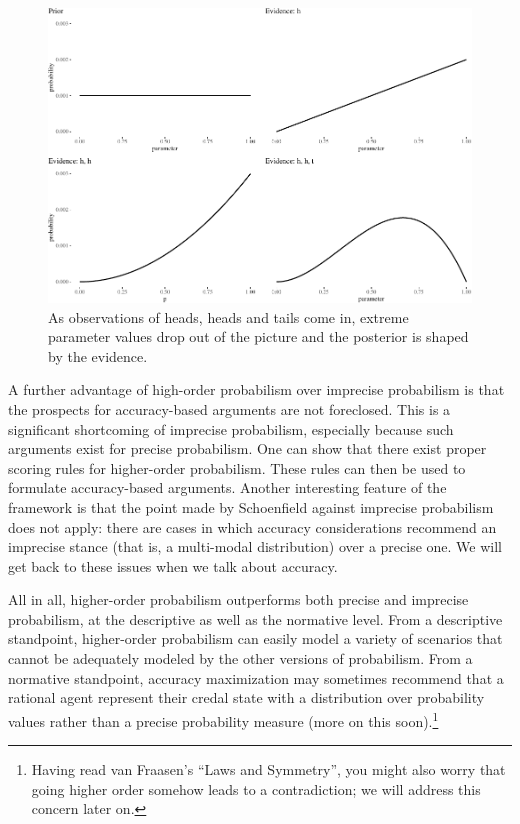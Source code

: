\documentclass[
  10pt,
  dvipsnames,enabledeprecatedfontcommands]{scrartcl}
\begin{document}
\begin{figure}

\begin{center}\includegraphics[width=0.8\linewidth]{imprecision_philosophical_paper._files/figure-latex/fig:inertia3-1} \end{center}
\caption{As observations of heads, heads and tails come in, extreme parameter values drop out of the picture and the posterior is shaped by the evidence.}
\label{fig:intertia2}
\end{figure}

A further advantage of high-order probabilism over imprecise probabilism
is that the prospects for accuracy-based arguments are not foreclosed.
This is a significant shortcoming of imprecise probabilism, especially
because such arguments exist for precise probabilism. One can show that
there exist proper scoring rules for higher-order probabilism. These
rules can then be used to formulate accuracy-based arguments. Another
interesting feature of the framework is that the point made by
Schoenfield against imprecise probabilism does not apply: there are
cases in which accuracy considerations recommend an imprecise stance
(that is, a multi-modal distribution) over a precise one. We will get
back to these issues when we talk about accuracy. 

All in all, higher-order probabilism outperforms both precise and
imprecise probabilism, at the descriptive as well as the normative
level. From a descriptive standpoint, higher-order probabilism can
easily model a variety of scenarios that cannot be adequately modeled by
the other versions of probabilism. From a normative standpoint, accuracy
maximization may sometimes recommend that a rational agent represent
their credal state with a distribution over probability values rather
than a precise probability
measure
(more on this soon).\footnote{Having read van Fraasen's ``Laws and
  Symmetry'', you might also worry that going higher order somehow leads
  to a contradiction; we will address this concern later on.}
\end{document}
